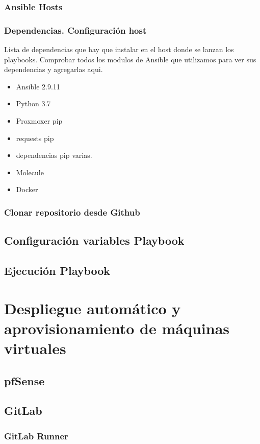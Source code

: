 			\subsubsection{Ansible Hosts}
			\subsubsection{Dependencias. Configuración host}
				\begin{paragraph}
					Lista de dependencias que hay que instalar en el host donde se lanzan los playbooks.
					Comprobar todos los modulos de Ansible que utilizamos para ver sus dependencias y agregarlas aqui.
					\begin{itemize}
						\item Ansible  2.9.11
						\item Python  3.7
						\item Proxmoxer pip
						\item requests pip 
						\item dependencias pip varias.
						\item Molecule
						\item Docker
					\end{itemize}
				\end{paragraph}
			\subsubsection{Clonar repositorio desde Github}
			
		\subsection{Configuración variables Playbook}
		\subsection{Ejecución Playbook}
	\section{Despliegue automático y aprovisionamiento de máquinas virtuales}
		\subsection{pfSense}
		\subsection{GitLab}
			\subsubsection{GitLab Runner}
